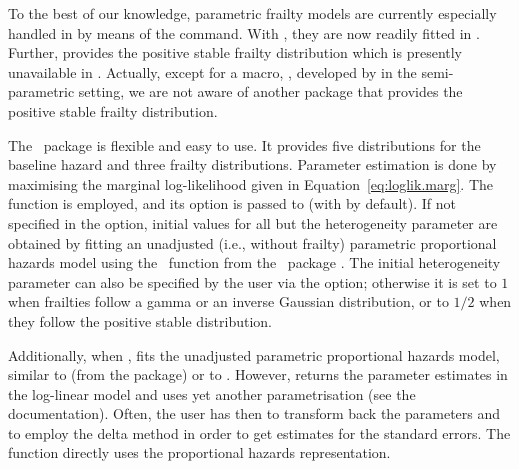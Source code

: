 To the best of our knowledge, parametric frailty models are currently especially handled in  
  by means of the  command.
With , they are now readily fitted in .
Further,  provides the positive stable frailty distribution 
  which is presently unavailable in .
Actually, except for a  macro, , 
  developed by \cite{ShuKlein99} in the semi-parametric setting, 
  we are not aware of another package that provides the positive stable frailty distribution.

The ~package is flexible and easy to use. 
It provides five distributions for the baseline hazard and three frailty distributions.
Parameter estimation is done by maximising the marginal log-likelihood given in Equation~\ref{eq:loglik.marg}.
The  function is employed, 
  and its  option is passed to  (with  by default).
If not specified in the  option, 
  initial values for all but the heterogeneity parameter are obtained by fitting 
  an unadjusted (i.e., without frailty) parametric proportional hazards model 
  using the ~function from the ~package \citep{R:eha}.
The initial heterogeneity parameter can also be specified by the user via the  option;
  otherwise it is set to $1$ when frailties follow a gamma or an inverse Gaussian distribution, 
  or to $1 \slash 2$ when they follow the positive stable distribution.

Additionally, when ,  fits the unadjusted parametric proportional hazards model,
  similar to  (from the  package) or to .
However,  returns the parameter estimates in the log-linear model 
  and  uses yet another parametrisation (see the documentation).
Often, the user has then to transform back the parameters 
  and to employ the delta method in order to get estimates for the standard errors.
The  function directly uses the proportional hazards representation.

